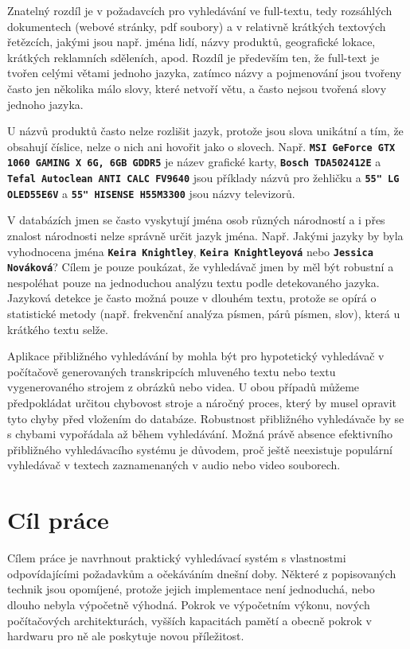 \documentclass[11pt,letterpaper,oneside,openright]{book}
\newcommand{\bftt}[1]{\texttt{\textbf{#1}}}
\begin{document}
Znatelný rozdíl je v požadavcích pro vyhledávání ve full-textu, tedy rozsáhlých
dokumentech (webové stránky, pdf soubory) a v relativně krátkých textových
řetězcích, jakými jsou např. jména lidí, názvy produktů, geografické lokace,
krátkých reklamních sděleních, apod. Rozdíl je především ten, že full-text je
tvořen celými větami jednoho jazyka, zatímco názvy a pojmenování jsou tvořeny
často jen několika málo slovy, které netvoří větu, a často nejsou tvořená slovy
jednoho jazyka. 

U názvů produktů často nelze rozlišit jazyk, protože jsou slova unikátní a tím,
že obsahují číslice, nelze o nich ani hovořit jako o slovech. Např. \bftt{MSI
GeForce GTX 1060 GAMING X 6G, 6GB GDDR5} je název grafické karty, \bftt{Bosch
TDA502412E} a \bftt{Tefal Autoclean ANTI CALC FV9640} jsou příklady názvů pro
žehličku a \bftt{55" LG OLED55E6V} a \bftt{55" HISENSE H55M3300} jsou názvy
televizorů. 

V databázích jmen se často vyskytují jména osob různých národností a i přes
znalost národnosti nelze správně určit jazyk jména. Např. Jakými jazyky by byla
vyhodnocena jména \bftt{Keira Knightley}, \bftt{Keira Knightleyová} nebo
\bftt{Jessica Nováková}? Cílem je pouze poukázat, že vyhledávač jmen by měl být
robustní a nespoléhat pouze na jednoduchou analýzu textu podle detekovaného
jazyka. Jazyková detekce je často možná pouze v dlouhém textu, protože se opírá
o statistické metody (např. frekvenční analýza písmen, párů písmen, slov),
která u krátkého textu selže.

Aplikace přibližného vyhledávání by mohla být pro hypotetický vyhledávač v
počítačově generovaných transkripcích mluveného textu nebo textu vygenerovaného
strojem z obrázků nebo videa. U obou případů můžeme předpokládat určitou
chybovost stroje a náročný proces, který by musel opravit tyto chyby před
vložením do databáze. Robustnost přibližného vyhledávače by se s chybami
vypořádala až během vyhledávání. Možná právě absence efektivního přibližného
vyhledávacího systému je důvodem, proč ještě neexistuje populární vyhledávač v
textech zaznamenaných v audio nebo video souborech.



\section{Cíl práce}
Cílem práce je navrhnout praktický vyhledávací systém s vlastnostmi
odpovídajícími požadavkům a očekáváním dnešní doby. Některé z popisovaných
technik jsou opomíjené, protože jejich implementace není jednoduchá, nebo
dlouho nebyla výpočetně výhodná. Pokrok ve výpočetním výkonu, nových
počítačových architekturách, vyšších kapacitách pamětí a obecně pokrok v
hardwaru pro ně ale poskytuje novou příležitost.
\end{document}
